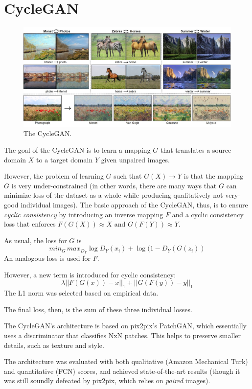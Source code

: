 \documentclass{article}
\begin{document}
    
\section{CycleGAN}

    \begin{figure}[H]
        \centerline{\includegraphics[scale=0.3]{cyclegan.jpg}}
        \caption{The CycleGAN.}
        \label{fig:cyclegan}
    \end{figure}

    The goal of the CycleGAN is to learn a mapping $G$ that translates a source domain $X$ to a target domain $Y$ given unpaired images.
    
    However, the problem of learning $G$ such that $G(X) \rightarrow Y$ is that the mapping $G$ is very under-constrained (in other words, there are many ways that $G$ can minimize loss of the dataset as a whole while producing qualitatively not-very-good individual images). The basic approach of the CycleGAN, thus, is to ensure \textit{cyclic consistency} by introducing an inverse mapping $F$ and a cyclic consistency loss that enforces $F(G(X)) \approx X$ and $G(F(Y)) \approx Y$.

    As usual, the loss for $G$ is $$min_G\,max_{D_Y} \log D_Y(x_i) + \log(1-D_Y(G(z_i))$$ An analogous loss is used for $F$.
    
    However, a new term is introduced for cyclic consistency: $$\lambda ||F(G(x)) - x||_1 + ||G(F(y)) - y||_1$$ The L1 norm was selected based on empirical data.
    
    The final loss, then, is the sum of these three individual losses.
    
    The CycleGAN's architecture is based on pix2pix's PatchGAN, which essentially uses a discriminator that classifies NxN patches. This helps to preserve smaller details, such as texture and style.
    
    The architecture was evaluated with both qualitative (Amazon Mechanical Turk) and quantitative (FCN) scores, and achieved state-of-the-art results (though it was still soundly defeated by pix2pix, which relies on \textit{paired} images).
    
\end{document}
